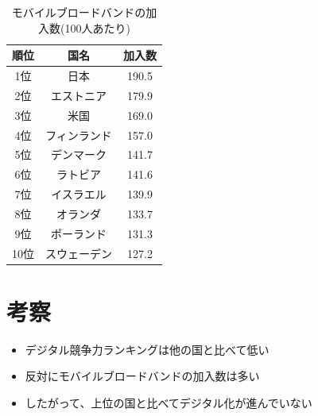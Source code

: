\documentclass[a4paper,11pt,dvipdfmx]{ujarticle}
\begin{document}
\begin{table}[htbp]
    \centering
     \caption{モバイルブロードバンドの加入数(100人あたり)}\label{tbl:myTbl}
     \begin{tabular}{|c|c|c|}
      \hline
      順位&国名&加入数\\
      \hline
     1位&日本&190.5\\
     \hline
     2位&エストニア&179.9\\
     \hline
     3位&米国&169.0\\
     \hline
     4位&フィンランド&157.0\\
     \hline
     5位&デンマーク&141.7\\
     \hline
     6位&ラトビア&141.6\\
     \hline
     7位&イスラエル&139.9\\
     \hline
     8位&オランダ&133.7\\
     \hline
     9位&ポーランド&131.3\\
     \hline
     10位&スウェーデン&127.2\\
     \hline
    \end{tabular}  
\end{table}  







\section{考察}


\begin{itemize}
    \item デジタル競争力ランキングは他の国と比べて低い
    \item 反対にモバイルブロードバンドの加入数は多い
    \item したがって、上位の国と比べてデジタル化が進んでいない
\end{itemize}


\end{document}
